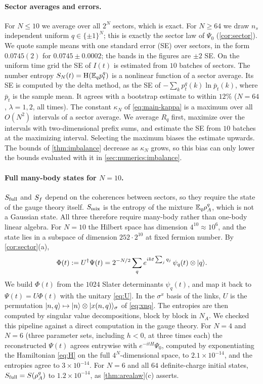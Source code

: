 \paragraph{Sector averages and errors.}  For $N\le10$ we average over all $2^N$ sectors, which is exact.
For $N\ge64$ we draw $n_s$ independent uniform $q\in\{\pm1\}^N$; this is exactly the sector law of $\Psi_0$
(\cref{cor:sector}).  We quote sample means with one standard error (SE) over sectors, in the form
$0.0745(2)$ for $0.0745\pm0.0002$; the bands in the figures are $\pm2$ SE.  On the uniform time grid the SE
of $I(t)$ is estimated from $10$ batches of sectors.  The number entropy $S_{N}(t)=\mathrm{H}(\mathbb{E}_qp^q_t)$ is a
nonlinear function of a sector average.  Its SE is computed by the delta method, as the SE of
$-\sum_kp^q_t(k)\ln\bar p_t(k)$, where $\bar p_t$ is the sample mean.  It agrees with a bootstrap estimate to
within $12\%$ ($N=64$, $\lambda=1,2$, all times).  The constant $\kappa_N$ of \eqref{eq:main-kappa} is a maximum
over all $O(N^2)$ intervals of a sector average.  We average $R_q$ first, maximize over the intervals with
two-dimensional prefix sums, and estimate the SE from $10$ batches at the maximizing interval.  Selecting
the maximum biases the estimate upwards.  The bounds of \cref{thm:imbalance} decrease as $\kappa_N$ grows, so this bias
can only lower the bounds evaluated with it in \cref{sec:numerics:imbalance}.

\paragraph{Full many-body states for $N=10$.}  $S_{\mathrm{full}}$ and $S_{f}$ depend on the coherences between
sectors, so they require the state of the gauge theory itself.  $S_{\mathrm{mix}}$ is the entropy of the mixture $\mathbb{E}_q\rho^q_A$,
which is not a Gaussian state.  All three therefore require many-body rather than one-body linear algebra.  For $N=10$ the Hilbert space has dimension $4^{10}\approx10^6$, and the
state lies in a subspace of dimension $252\cdot2^{10}$ at fixed fermion number.  By \cref{cor:sector}(a),
\[
  \Phi(t):=U^\dagger\Psi(t)=2^{-N/2}\sum_qe^{iht\sum_jq_j}\,\psi_q(t)\otimes|q\rangle .
\]
We build $\Phi(t)$ from the $1024$ Slater determinants $\psi_q(t)$, and map it back to $\Psi(t)=U\Phi(t)$ with the
unitary \eqref{eq:U}.  In the $\sigma^x$ basis of the links, $U$ is the permutation $|n,q\rangle\mapsto|n\rangle\otimes|x(n,q)\rangle_\sigma$ of
\eqref{eq:xnq}.  The entropies are then computed by singular value decompositions, block by block in
$N_A$.  We checked this pipeline against a direct computation in the gauge theory.  For $N=4$ and $N=6$
(three parameter sets, including $h<0$, at three times each) the reconstructed $\Psi(t)$ agrees entrywise with
$e^{-itH}\Psi_0$, computed by exponentiating the Hamiltonian \eqref{eq:H} on the full $4^N$-dimensional
space, to $2.1\times10^{-14}$, and the entropies agree to $3\times10^{-14}$.  For $N=6$ and all $64$
definite-charge initial states, $S_{\mathrm{full}}=S(\rho^q_A)$ to $1.2\times10^{-14}$, as \cref{thm:arealaw}(c) asserts.

